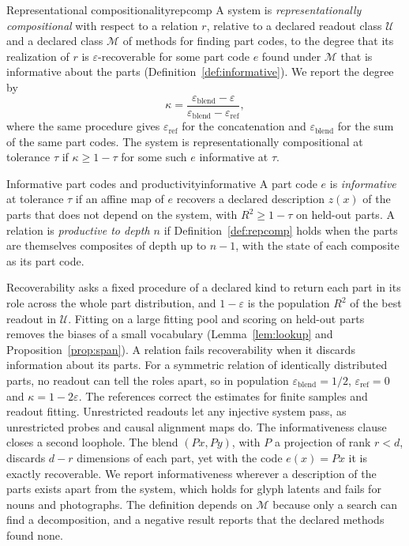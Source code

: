 \documentclass[10pt]{article}
\theoremstyle{plain}
\theoremstyle{remark}
\newcommand{\U}{\mathcal{U}}
\newcommand{\M}{\mathcal{M}}
\begin{document}
\begin{defbox}{Representational compositionality}{repcomp}
A system is \emph{representationally compositional} with respect to a relation $r$, relative to a declared readout class $\U$ and a declared class $\M$ of methods for finding part codes, to the degree that its realization of $r$ is $\varepsilon$-recoverable for some part code $e$ found under $\M$ that is informative about the parts (Definition~\ref{def:informative}). We report the degree by
\begin{equation}
  \kappa = \frac{\varepsilon_{\mathrm{blend}} - \varepsilon}{\varepsilon_{\mathrm{blend}} - \varepsilon_{\mathrm{ref}}},
  \label{eq:kappa}
\end{equation}
where the same procedure gives $\varepsilon_{\mathrm{ref}}$ for the concatenation and $\varepsilon_{\mathrm{blend}}$ for the sum of the same part codes. The system is representationally compositional at tolerance $\tau$ if $\kappa \ge 1 - \tau$ for some such $e$ informative at $\tau$.
\end{defbox}

\begin{defbox}{Informative part codes and productivity}{informative}
A part code $e$ is \emph{informative} at tolerance $\tau$ if an affine map of $e$ recovers a declared description $z(x)$ of the parts that does not depend on the system, with $R^2 \ge 1 - \tau$ on held-out parts. A relation is \emph{productive to depth $n$} if Definition~\ref{def:repcomp} holds when the parts are themselves composites of depth up to $n - 1$, with the state of each composite as its part code.
\end{defbox}

Recoverability asks a fixed procedure of a declared kind to return each part in its role across the whole part distribution, and $1 - \varepsilon$ is the population $R^2$ of the best readout in $\U$. Fitting on a large fitting pool and scoring on held-out parts removes the biases of a small vocabulary (Lemma~\ref{lem:lookup} and Proposition~\ref{prop:span}). A relation fails recoverability when it discards information about its parts. For a symmetric relation of identically distributed parts, no readout can tell the roles apart, so in population $\varepsilon_{\mathrm{blend}} = 1/2$, $\varepsilon_{\mathrm{ref}} = 0$ and $\kappa = 1 - 2\varepsilon$. The references correct the estimates for finite samples and readout fitting. Unrestricted readouts let any injective system pass, as unrestricted probes \citep{hewitt2019} and causal alignment maps \citep{sutter2025} do. The informativeness clause closes a second loophole. The blend $(Px, Py)$, with $P$ a projection of rank $r < d$, discards $d - r$ dimensions of each part, yet with the code $e(x) = Px$ it is exactly recoverable. We report informativeness wherever a description of the parts exists apart from the system, which holds for glyph latents and fails for nouns and photographs. The definition depends on $\M$ because only a search can find a decomposition, and a negative result reports that the declared methods found none.
\end{document}

